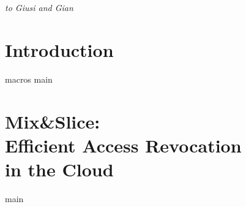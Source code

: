 \documentclass[12pt,a4paper,oldfontcommands,openright]{memoir}
\begin{document}


\cleardoublepage

\cleardoublepage
\thispagestyle{empty}
\begin{abstract}
{main}
\end{abstract}
\cleardoublepage




\tableofcontents*
\cleardoublepage

\listoffigures*
\cleardoublepage



\cleardoublepage
\thispagestyle{empty}
\begin{flushright}
	\itshape to Giusi and Gian\\
\end{flushright}
\cleardoublepage




\chapter[Introduction]{Introduction}
\label{chap:intro}
{macros}
{main}

\chapter[Mix\&Slice]{Mix\&Slice:\\Efficient Access Revocation\\in the Cloud}
\label{chap:waont}
{main}
\end{document}
